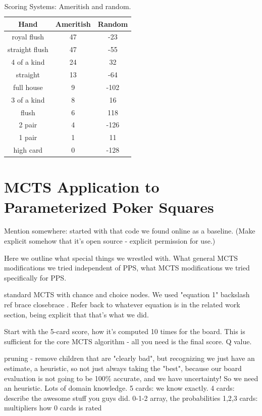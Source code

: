 \documentclass[letterpaper]{article}
\begin{document}
\begin{table}
\caption{Scoring Systems: Ameritish and random.}
\label{tbl:SSAMBR}
\centering
\begin{tabular}{c c c}
\hline
Hand & Ameritish & Random \\
\hline
royal flush & 47 & -23 \\
straight flush & 47 & -55 \\
4 of a kind & 24 & 32 \\
straight & 13 & -64 \\
full house & 9 & -102 \\
3 of a kind & 8 & 16 \\
flush & 6 & 118 \\
2 pair & 4 & -126 \\
1 pair & 1 & 11 \\
high card & 0 & -128 \\
\hline
\end{tabular}
\end{table}

\section{MCTS Application to Parameterized Poker Squares}

Mention somewhere: started with that code we found online as a baseline. (Make explicit somehow that it's open source - explicit permission for use.)

Here we outline what special things we wrestled with. What general MCTS modifications we tried independent of PPS, what MCTS modifications we tried specifically for PPS.

standard MCTS with chance and choice nodes. We used "equation 1"   backslash ref brace  closebrace   . Refer back to whatever equation is in the related work section, being explicit that that's what we did.

Start with the 5-card score, how it's computed 10 times for the board. This is sufficient for the core MCTS algorithm - all you need is the final score. Q value.

pruning - remove children that are "clearly bad", but recognizing we just have an estimate, a heuristic, so not just always taking the "best", because our board evaluation is not going to be 100\% accurate, and we have uncertainty! So we need an heuristic. Lots of domain knowledge.
5 cards: we know exactly.
4 cards: describe the awesome stuff you guys did. 0-1-2 array, the probabilities
1,2,3 cards: multipliers
how 0 cards is rated
\end{document}
